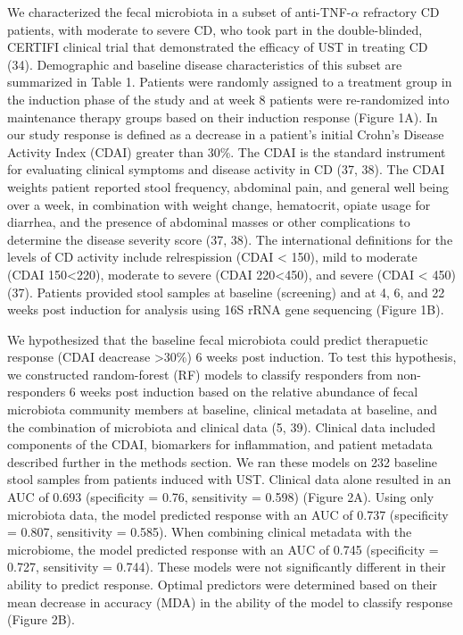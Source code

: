 \documentclass[11pt,]{article}
\begin{document}
We characterized the fecal microbiota in a subset of
anti-TNF-\({\alpha}\) refractory CD patients, with moderate to severe
CD, who took part in the double-blinded, CERTIFI clinical trial that
demonstrated the efficacy of UST in treating CD (34). Demographic and
baseline disease characteristics of this subset are summarized in Table
1. Patients were randomly assigned to a treatment group in the induction
phase of the study and at week 8 patients were re-randomized into
maintenance therapy groups based on their induction response (Figure
1A). In our study response is defined as a decrease in a patient's
initial Crohn's Disease Activity Index (CDAI) greater than 30\%. The
CDAI is the standard instrument for evaluating clinical symptoms and
disease activity in CD (37, 38). The CDAI weights patient reported stool
frequency, abdominal pain, and general well being over a week, in
combination with weight change, hematocrit, opiate usage for diarrhea,
and the presence of abdominal masses or other complications to determine
the disease severity score (37, 38). The international definitions for
the levels of CD activity include relrespission (CDAI \textless{} 150),
mild to moderate (CDAI 150\textless{}220), moderate to severe (CDAI
220\textless{}450), and severe (CDAI \textless{} 450) (37). Patients
provided stool samples at baseline (screening) and at 4, 6, and 22 weeks
post induction for analysis using 16S rRNA gene sequencing (Figure 1B).

We hypothesized that the baseline fecal microbiota could predict
therapuetic response (CDAI deacrease \textgreater{}30\%) 6 weeks post
induction. To test this hypothesis, we constructed random-forest (RF)
models to classify responders from non-responders 6 weeks post induction
based on the relative abundance of fecal microbiota community members at
baseline, clinical metadata at baseline, and the combination of
microbiota and clinical data (5, 39). Clinical data included components
of the CDAI, biomarkers for inflammation, and patient metadata described
further in the methods section. We ran these models on 232 baseline
stool samples from patients induced with UST. Clinical data alone
resulted in an AUC of 0.693 (specificity = 0.76, sensitivity = 0.598)
(Figure 2A). Using only microbiota data, the model predicted response
with an AUC of 0.737 (specificity = 0.807, sensitivity = 0.585). When
combining clinical metadata with the microbiome, the model predicted
response with an AUC of 0.745 (specificity = 0.727, sensitivity =
0.744). These models were not significantly different in their ability
to predict response. Optimal predictors were determined based on their
mean decrease in accuracy (MDA) in the ability of the model to classify
response (Figure 2B).
\end{document}
